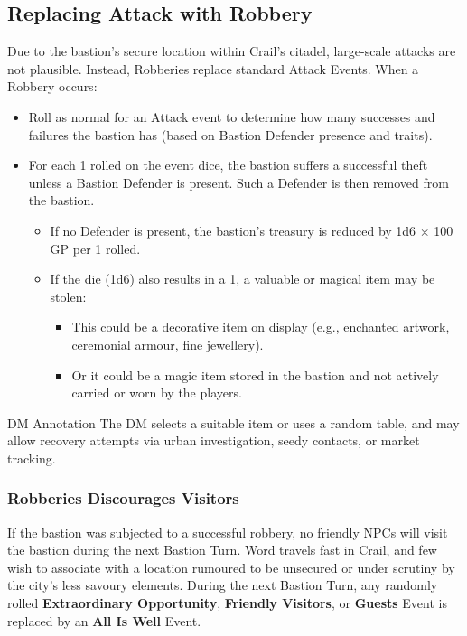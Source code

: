 \subsection*{Replacing Attack with Robbery}
{\entryfont Due to the bastion's secure location within Crail's citadel, large-scale attacks are not plausible. Instead, Robberies replace standard Attack Events. When a Robbery occurs:
\begin{itemize}
	\item Roll as normal for an Attack event to determine how many successes and failures the bastion has (based on Bastion Defender presence and traits).
	\item For each 1 rolled on the event dice, the bastion suffers a successful theft unless a Bastion Defender is present. Such a Defender is then removed from the bastion.
	\begin{itemize}
		\item If no Defender is present, the bastion's treasury is reduced by 1d6 × 100 GP per 1 rolled.
		\item If the die (1d6) also results in a 1, a valuable or magical item may be stolen:
		\begin{itemize}
			\item This could be a decorative item on display (e.g., enchanted artwork, ceremonial armour, fine jewellery).
			\item Or it could be a magic item stored in the bastion and not actively carried or worn by the players.
		\end{itemize}
	\end{itemize}
\end{itemize}
}
\begingroup
	\DndSetThemeColor[PhbTan]
	\begin{DndComment}{DM Annotation}
		The DM selects a suitable item or uses a random table, and may allow recovery attempts via urban investigation, seedy contacts, or market tracking.
	\end{DndComment}
\endgroup
\subsubsection*{Robberies Discourages Visitors}
{\entryfont If the bastion was subjected to a successful robbery, no friendly NPCs will visit the bastion during the next Bastion Turn. Word travels fast in Crail, and few wish to associate with a location rumoured to be unsecured or under scrutiny by the city's less savoury elements. During the next Bastion Turn, any randomly rolled \textbf{Extraordinary Opportunity}, \textbf{Friendly Visitors}, or \textbf{Guests} Event is replaced by an \textbf{All Is Well} Event.}

